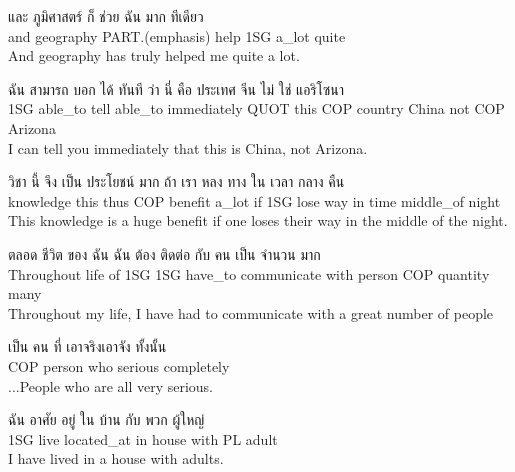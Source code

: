 \documentclass{book}
\begin{document}
	\begin{exe}
		\ex
		\gll และ ภูมิศาสตร์ ก็ ช่วย ฉัน มาก ทีเดียว\\
		and geography \textsc{PART}.(emphasis) help \textsc{1SG} a\_lot quite\\
		And geography has truly helped me quite a lot.
	\end{exe}

	\begin{exe}
		\ex
		\gll ฉัน สามารถ บอก ได้ ทันที ว่า นี่ คือ ประเทศ จีน ไม่ ใช่ แอริโซนา\\
		\textsc{1SG} able\_to tell able\_to immediately \textsc{QUOT} this \textsc{COP} country China not \textsc{COP} Arizona\\
		I can tell you immediately that this is China, not Arizona.
	\end{exe}

	\begin{exe}
		\ex
		\gll วิชา นี้ จึง เป็น ประโยชน์ มาก ถ้า เรา หลง ทาง ใน เวลา กลาง คืน\\
		knowledge this thus \textsc{COP} benefit a\_lot if \textsc{1SG} lose way in time middle\_of night\\
		This knowledge is a huge benefit if one loses their way in the middle of the night.
	\end{exe}

	\begin{exe}
		\ex
		\gll ตลอด ชีวิต ของ ฉัน ฉัน ต้อง ติดต่อ กับ คน เป็น จำนวน มาก\\
		Throughout life of \textsc{1SG} \textsc{1SG} have\_to communicate with person \textsc{COP} quantity many\\
		Throughout my life, I have had to communicate with a great number of people
	\end{exe}

	\begin{exe}
		\ex
		\gll เป็น คน ที่ เอาจริงเอาจัง ทั้งนั้น\\
		\textsc{COP} person who serious completely\\
		...People who are all very serious.
	\end{exe}

	\begin{exe}
		\ex
		\gll ฉัน อาศัย อยู่ ใน บ้าน กับ พวก ผู้ใหญ่\\
		\textsc{1SG} live located\_at in house with \textsc{PL} adult\\
		I have lived in a house with adults.
	\end{exe}
\end{document}
